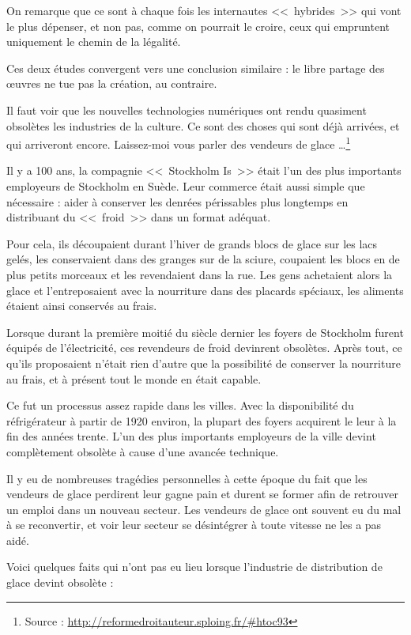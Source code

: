 On remarque que ce sont à chaque fois les internautes <<~hybrides~>> qui vont le plus dépenser, et non pas, comme on pourrait le croire, ceux qui empruntent uniquement le chemin de la légalité.

Ces deux études convergent vers une conclusion similaire : le libre partage des œuvres ne tue pas la création, au contraire.

Il faut voir que les nouvelles technologies numériques ont rendu quasiment obsolètes les industries de la culture.
Ce sont des choses qui sont déjà arrivées, et qui arriveront encore.
Laissez-moi vous parler des vendeurs de glace \dots{}\footnote{Source : \url{http://reformedroitauteur.sploing.fr/\#htoc93}}

Il y a 100 ans, la compagnie <<~Stockholm Is~>> était l'un des plus importants employeurs de Stockholm en Suède. Leur commerce était aussi simple que nécessaire : aider à conserver les denrées périssables plus longtemps en distribuant du <<~froid~>> dans un format adéquat.

Pour cela, ils découpaient durant l'hiver de grands blocs de glace sur les lacs gelés, les conservaient dans des granges sur de la sciure, coupaient les blocs en de plus petits morceaux et les revendaient dans la rue. Les gens achetaient alors la glace et l'entreposaient avec la nourriture dans des placards spéciaux, les aliments étaient ainsi conservés au frais.

Lorsque durant la première moitié du siècle dernier les foyers de Stockholm furent équipés de l'électricité, ces revendeurs de froid devinrent obsolètes. Après tout, ce qu'ils proposaient n'était rien d'autre que la possibilité de conserver la nourriture au frais, et à présent tout le monde en était capable.

Ce fut un processus assez rapide dans les villes. Avec la disponibilité du réfrigérateur à partir de 1920 environ, la plupart des foyers acquirent le leur à la fin des années trente. L'un des plus importants employeurs de la ville devint complètement obsolète à cause d'une avancée technique.

Il y eu de nombreuses tragédies personnelles à cette époque du fait que les vendeurs de glace perdirent leur gagne pain et durent se former afin de retrouver un emploi dans un nouveau secteur. Les vendeurs de glace ont souvent eu du mal à se reconvertir, et voir leur secteur se désintégrer à toute vitesse ne les a pas aidé.

Voici quelques faits qui n'ont pas eu lieu lorsque l'industrie de distribution de glace devint obsolète :

